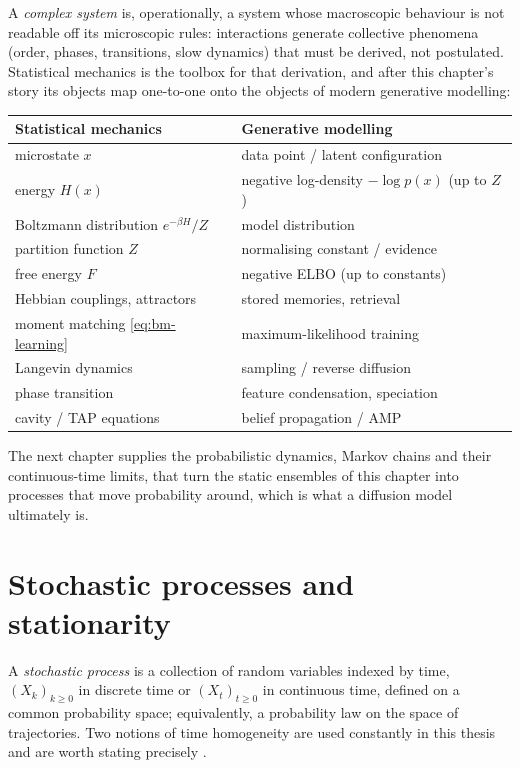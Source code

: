 A \emph{complex system} is, operationally, a system whose macroscopic
behaviour is not readable off its microscopic rules: interactions
generate collective phenomena (order, phases, transitions, slow dynamics)
that must be derived, not postulated. Statistical mechanics is the
toolbox for that derivation, and after this chapter's story its objects
map one-to-one onto the objects of modern generative modelling:
\begin{center}
\begin{tabular}{ll}
\toprule
\textbf{Statistical mechanics} & \textbf{Generative modelling} \\
\midrule
microstate $x$ & data point / latent configuration \\
energy $H(x)$ & negative log-density $-\log p(x)$ (up to $Z$) \\
Boltzmann distribution $e^{-\beta H}/Z$ & model distribution \\
partition function $Z$ & normalising constant / evidence \\
free energy $F$ & negative ELBO (up to constants) \\
Hebbian couplings, attractors & stored memories, retrieval \\
moment matching \eqref{eq:bm-learning} & maximum-likelihood training \\
Langevin dynamics & sampling / reverse diffusion \\
phase transition & feature condensation, speciation \\
cavity / TAP equations & belief propagation / AMP \\
\bottomrule
\end{tabular}
\end{center}
The next chapter supplies the probabilistic dynamics, Markov chains and
their continuous-time limits, that turn the static ensembles of this
chapter into processes that move probability around, which is what a
diffusion model ultimately is.
\section{Stochastic processes and stationarity}\label{sec:stationarity}

A \emph{stochastic process} is a collection of random variables indexed
by time, $(X_k)_{k \geq 0}$ in discrete time or $(X_t)_{t \geq 0}$ in
continuous time, defined on a common probability space; equivalently, a
probability law on the space of trajectories. Two notions of time
homogeneity are used constantly in this thesis and are worth stating
precisely \citep{brockwell1991time}.

